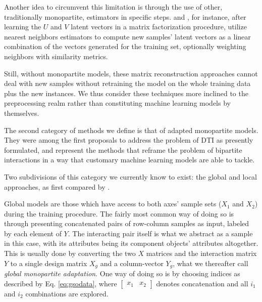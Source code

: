 \documentclass[conference]{IEEEtran}
\newcommand{\el}[1]{^{[#1]}}
\begin{document}
Another idea to circumvent this limitation is through the use of other,
traditionally monopartite, estimators in specific steps. \cite{} and \cite{},
for instance, after learning the $U$ and $V$ latent vectors in a matrix
factorization procedure, utilize nearest neighbors estimators to compute new
samples' latent vectors as a linear combination of the vectors generated for the
training set, optionally weighting neighbors with similarity metrics.

Still, without monopartite models, these matrix reconstruction approaches cannot
deal with new samples without retraining the model on the whole training data
plus the new instances. We thus consider these techniques more inclined to the
preprocessing realm rather than constituting machine learning models by
themselves.

The second category of methods we define is that of adapted monopartite models.
They were among the first proposals to address the problem of DTI as presently
formulated, and represent the methods that reframe the problem of bipartite
interactions in a way that customary machine learning models are able to tackle.

Two subdivisions of this category we currently know to exist: the global and
local approaches, as first compared by \cite{}.

Global models are those which have access to both axes' sample sets ($X_1$ and
$X_2$) during the training procedure. The fairly most common way of doing so is
through presenting concatenated pairs of row-column samples as input, labeled by
each element of $Y$. The interacting pair itself is what we abstract as a sample
in this case, with its attributes being its component objects' attributes
altogether. This is usually done by converting the two $X$ matrices and the
interaction matrix $Y$ to a single design matrix $X_g$ and a column-vector
$Y_g$, what we thereafter call \emph{global monopartite adaptation}. One way of
doing so is by choosing indices as described by Eq. \ref{eq:gsodata}, where
$\begin{bmatrix} x_1 & x_2\end{bmatrix}$ denotes concatenation and all $i_1$ and
$i_2$ combinations are explored.
\end{document}
